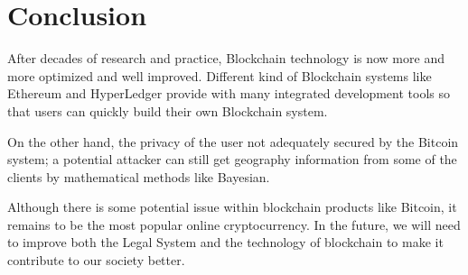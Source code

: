 \documentclass[runningheads]{llncs}
\begin{document}
\section{Conclusion}
After decades of research and practice, Blockchain technology is now more and more optimized and well improved. Different kind of Blockchain systems like Ethereum and HyperLedger provide with many integrated development tools so that users can quickly build their own Blockchain system.

On the other hand, the privacy of the user not adequately secured by the Bitcoin system; a potential attacker can still get geography information from some of the clients by mathematical methods like Bayesian.

Although there is some potential issue within blockchain products like Bitcoin, it remains to be the most popular online cryptocurrency. In the future, we will need to improve both the Legal System and the technology of blockchain to make it contribute to our society better.


\newpage


\end{document}
